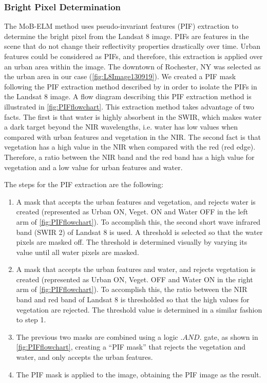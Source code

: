 \documentclass[onecolumn,3p,letterpaper]{elsarticle}
\begin{document}
\subsubsection{Bright Pixel Determination}

The MoB-ELM method uses pseudo-invariant features (PIF) extraction to determine the bright pixel from the Landsat 8 image. PIFs are features in the scene that do not change their reflectivity properties drastically over time. Urban features could be considered as PIFs, and therefore, this extraction is applied over an urban area within the image. The downtown of Rochester, NY was selected as the urban area in our case (\autoref{fig:L8Image130919}). We created a PIF mask following the PIF extraction method described by \citet{Schott:1988} in order to isolate the PIFs in the Landsat 8 image. A flow diagram describing this PIF extraction method is illustrated in \autoref{fig:PIFflowchart}. This extraction method takes advantage of two facts. The first is that water is highly absorbent in the SWIR, which makes water a dark target beyond the NIR wavelengths, i.e. water has low values when compared with urban features and vegetation in the NIR. The second fact is that vegetation has a high value in the NIR when compared with the red (red edge). Therefore, a ratio between the NIR band and the red band has a high value for vegetation and a low value for urban features and water. 

The steps for the PIF extraction are the following:
\begin{enumerate}\itemsep10pt
	\item A mask that accepts the urban features and vegetation, and rejects water is created (represented as Urban ON, Veget. ON and Water OFF in the left arm of \autoref{fig:PIFflowchart}). To accomplish this, the second short wave infrared band (SWIR 2) of Landsat 8 is used. A threshold is selected so that the water pixels are masked off. The threshold is determined visually by varying its value until all water pixels are masked. 
	\item A mask that accepts the urban features and water, and rejects vegetation is created (represented as Urban ON, Veget. OFF and Water ON in the right arm of \autoref{fig:PIFflowchart}). To accomplish this, the ratio between the NIR band and red band of Landsat 8 is thresholded so that the high values for vegetation are rejected. The threshold value is determined in a similar fashion to step 1.
	\item The previous two masks are combined using a logic $.AND.$ gate, as shown in \autoref{fig:PIFflowchart}, creating a ``PIF mask'' that rejects the vegetation and water, and only accepts the urban features.
	\item The PIF mask is applied to the image, obtaining the PIF image as the result.

\end{enumerate}
\end{document}
